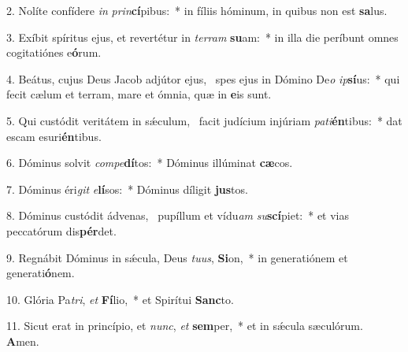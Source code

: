 2. Nolíte confídere \textit{in} \textit{prin}\textbf{cí}pibus:~*  in fíliis hóminum, in quibus non est \textbf{sa}lus.\

3. Exíbit spíritus ejus, et revertétur in \textit{ter}\textit{ram} \textbf{su}am:~*  in illa die períbunt omnes cogitatiónes e\textbf{ó}rum.\

4. Beátus, cujus Deus Jacob adjútor ejus, \dag\  spes ejus in Dómino De\textit{o} \textit{ip}\textbf{sí}us:~*  qui fecit cælum et terram, mare et ómnia, quæ in \textbf{e}is sunt.\

5. Qui custódit veritátem in sǽculum, \dag\  facit judícium injúriam \textit{pa}\textit{ti}\textbf{én}tibus:~*  dat escam esuri\textbf{én}tibus.\

6. Dóminus solvit \textit{com}\textit{pe}\textbf{dí}tos:~*  Dóminus illúminat \textbf{cæ}cos.\

7. Dóminus éri\textit{git} \textit{e}\textbf{lí}sos:~*  Dóminus díligit \textbf{jus}tos.\

8. Dóminus custódit ádvenas, \dag\  pupíllum et vídu\textit{am} \textit{su}\textbf{scí}piet:~*  et vias peccatórum dis\textbf{pér}det.\

9. Regnábit Dóminus in sǽcula, Deus \textit{tu}\textit{us}, \textbf{Si}on,~*  in generatiónem et generati\textbf{ó}nem.\

10. Glória Pa\textit{tri}, \textit{et} \textbf{Fí}lio,~*  et Spirítui \textbf{Sanc}to.\

11. Sicut erat in princípio, et \textit{nunc}, \textit{et} \textbf{sem}per,~*  et in sǽcula sæculórum. \textbf{A}men.\

